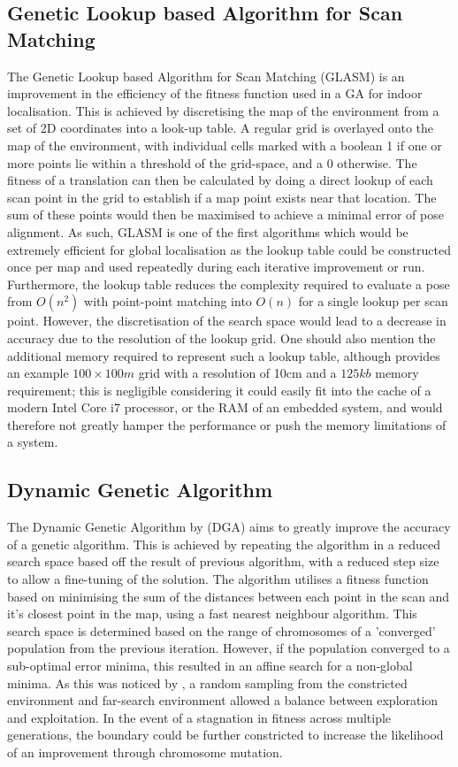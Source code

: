 \documentclass[authoryearcitations]{UoYCSproject}
\begin{document}
\subsection{Genetic Lookup based Algorithm for Scan Matching}
The Genetic Lookup based Algorithm for Scan Matching (GLASM) \cite{Lenac2007-xm} is an improvement in the efficiency of the fitness function used in a GA for indoor localisation. This is achieved by discretising the map of the environment from a set of 2D coordinates into a look-up table. A regular grid is overlayed onto the map of the environment, with individual cells marked with a boolean 1 if one or more points lie within a threshold of the grid-space, and a 0 otherwise. The fitness of a translation can then be calculated by doing a direct lookup of each scan point in the grid to establish if a map point exists near that location. The sum of these points would then be maximised to achieve a minimal error of pose alignment. As such, GLASM is one of the first algorithms which would be extremely efficient for global localisation as the lookup table could be constructed once per map and used repeatedly during each iterative improvement or run. Furthermore, the lookup table reduces the complexity required to evaluate a pose from $O(n^2)$ with point-point matching into $O(n)$ for a single lookup per scan point. However, the discretisation of the search space would lead to a decrease in accuracy due to the resolution of the lookup grid. One should also mention the additional memory required to represent such a lookup table, although \citeauthor{Lenac2007-xm} provides an example $100\times100m$ grid with a resolution of 10cm and a $125kb$ memory requirement; this is negligible considering it could easily fit into the cache of a modern Intel Core i7 processor, or the RAM of an embedded system, and would therefore not greatly hamper the performance or push the memory limitations of a system. 

\subsection{Dynamic Genetic Algorithm}
The Dynamic Genetic Algorithm by \citet{Chow2004-xc} (DGA) aims to greatly improve the accuracy of a genetic algorithm. This is achieved by repeating the algorithm in a reduced search space based off the result of previous algorithm, with a reduced step size to allow a fine-tuning of the solution. The algorithm utilises a fitness function based on minimising the sum of the distances between each point in the scan and it's closest point in the map, using a fast nearest neighbour algorithm. This search space is determined based on the range of chromosomes of a 'converged' population from the previous iteration. However, if the population converged to a sub-optimal error minima, this resulted in an affine search for a non-global minima. As this was noticed by \citeauthor{Chow2004-xc}, a random sampling from the constricted environment and far-search environment allowed a balance between exploration and exploitation. In the event of a stagnation in fitness across multiple generations, the boundary could be further constricted to increase the likelihood of an improvement through chromosome mutation. 
\end{document}
